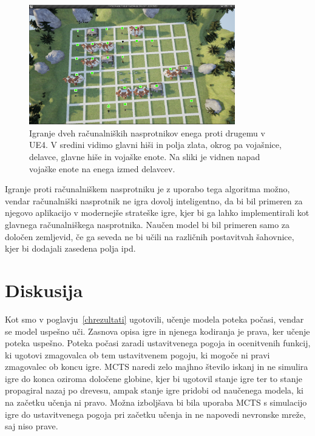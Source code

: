 \documentclass[a4paper, 12pt]{book}
\begin{document}
\begin{figure}[h!]
	\begin{center}
		\includegraphics[width=0.8\textwidth]{photos/ue4attack.pdf}
	\end{center}
	\caption{Igranje dveh računalniških nasprotnikov enega proti drugemu v UE4. V sredini vidimo glavni hiši in polja zlata, okrog pa vojašnice, delavce, glavne hiše in vojaške enote.
		Na sliki je vidnen napad vojaške enote na enega izmed delavcev. }
	\label{visualization_ue4}
\end{figure}

Igranje proti računalniškem nasprotniku je z uporabo tega algoritma možno, vendar računalniški nasprotnik ne igra dovolj inteligentno, da bi bil primeren za njegovo aplikacijo v modernejše strateške igre, kjer bi ga lahko implementirali kot glavnega računalniškega nasprotnika.
Naučen model bi bil primeren samo za določen zemljevid, če ga seveda ne bi učili na različnih postavitvah šahovnice, kjer bi dodajali zasedena polja ipd.


\chapter{Diskusija}
\label{chdiskusija}

Kot smo v poglavju~\ref{chrezultati} ugotovili, učenje modela poteka počasi, vendar se model uspešno uči.
Zasnova opisa igre in njenega kodiranja je prava, ker učenje poteka uspešno.
Poteka počasi zaradi ustavitvenega pogoja in ocenitvenih funkcij, ki ugotovi zmagovalca ob tem ustavitvenem pogoju, ki mogoče ni pravi zmagovalec ob koncu igre.
MCTS naredi zelo majhno število iskanj in ne simulira igre do konca oziroma določene globine, kjer bi ugotovil stanje igre ter to stanje propagiral nazaj po drevesu, ampak stanje igre pridobi od naučenega modela, ki na začetku učenja ni pravo.
Možna izboljšava bi bila uporaba MCTS s simulacijo igre do ustavitvenega pogoja pri začetku učenja in ne napovedi nevronske mreže, saj niso prave.
\end{document}

